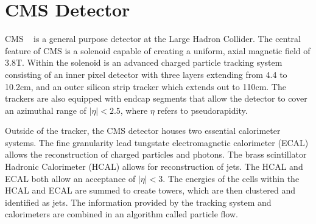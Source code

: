 \chapter{CMS Detector}
\label{sec:cms_detector}
CMS ~\cite{cmsexp} is a general purpose detector at the Large Hadron Collider.  The central 
feature of CMS is a solenoid capable of creating a uniform, axial magnetic field of 
3.8T.  Within the solenoid is an advanced charged particle tracking system consisting 
of an inner pixel detector with three layers extending from 4.4 to 10.2cm, and an 
outer silicon strip tracker which extends out to 110cm.  The trackers are also equipped 
with endcap segments that allow the detector to cover an azimuthal range of 
$|\eta| < 2.5$, where $\eta$ refers to  pseudorapidity. 
 
Outside of the tracker, the CMS detector houses two essential calorimeter systems.  
The fine granularity lead tungstate electromagnetic calorimeter (ECAL) allows the 
reconstruction of charged particles and photons.  The brass scintillator Hadronic 
Calorimeter (HCAL) allows for reconstruction of jets.  The HCAL and ECAL both allow an 
acceptance of $|\eta| < 3$.  The energies of the cells within the HCAL and ECAL are summed 
to create towers, which are then clustered and identified as jets.  The information provided 
by the tracking system and calorimeters are combined in an algorithm called particle flow.
